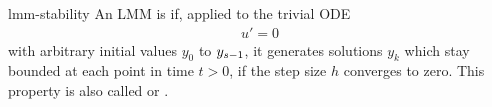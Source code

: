 \begin{Definition}{lmm-stability}
  An LMM is  if, applied to the trivial ODE
  \begin{gather}
    \label{eq:lmm:1}
      u' = 0
  \end{gather}
  with arbitrary initial values $y_0$ to $y_{s-1}$, it generates
  solutions $y_k$ which stay bounded at each point in time $t>0$, if
  the step size $h$ converges to zero. This property is also called
   or .
\end{Definition}

